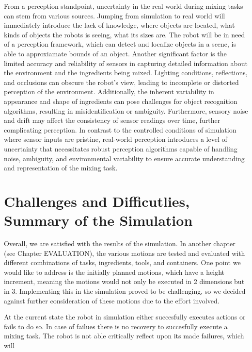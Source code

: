From a perception standpoint, uncertainty in the real world during mixing tasks can stem from various sources.
Jumping from simulation to real world will immediately introduce the lack of knowledge, where objects are located, what kinds of objects
the robots is seeing, what its sizes are. The robot will be in need of a perception framework, which can detect and localize objects in a scene,
is able to approxiamate bounds of an object.
Another significant factor is the limited accuracy and reliability of sensors in capturing detailed information about the environment and the ingredients being mixed.
Lighting conditions, reflections, and occlusions can obscure the robot's view, leading to incomplete or distorted perception of the environment.
Additionally, the inherent variability in appearance and shape of ingredients can pose challenges for object recognition algorithms, resulting in misidentification or ambiguity.
Furthermore, sensory noise and drift may affect the consistency of sensor readings over time, further complicating perception.
In contrast to the controlled conditions of simulation where sensor inputs are pristine, real-world perception introduces a level of uncertainty that necessitates robust perception algorithms capable of handling noise, ambiguity, and environmental variability to ensure accurate understanding and representation of the mixing task.


\section{Challenges and Difficutlies, Summary of the Simulation}
Overall, we are satisfied with the results of the simulation. In another chapter (see Chapter EVALUATION), the various motions are tested and evaluated with different combinations of tasks, ingredients, tools, and containers. One point we would like to address is the initially planned motions, which have a height increment, meaning the motions would not only be executed in 2 dimensions but in 3. Implementing this in the simulation proved to be challenging, so we decided against further consideration of these motions due to the effort involved.

At the current state the robot in simulation either succesfully executes actions or fails to do so.
In case of failues there is no recovery to succesfully execute a mixing task. The robot is not able critically
reflect upon its made failures, which will
